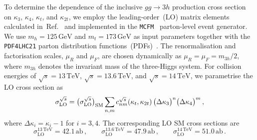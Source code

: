 \documentclass{SciPost}
\def\beq{\begin{equation}}
\def\eeq{\end{equation}}
\begin{document}
To determine the dependence of the inclusive $gg \to 3h$ production cross section on $\kappa_3$, $\kappa_4$, $\kappa_t$, and $\kappa_{2t}$, we employ the leading-order~(LO) matrix elements calculated in~Ref.~\cite{Campbell:2025llb} and implemented in the {\tt MCFM}~\cite{Campbell:1999ah,Campbell:2011bn,Campbell:2015qma,Campbell:2019dru} parton-level event generator. We use $m_h = 125\,\mathrm{GeV}$ and $m_t = 173\,\mathrm{GeV}$ as input parameters together with the {\tt PDF4LHC21} parton distribution functions~(PDFs)~\cite{PDF4LHCWorkingGroup:2022cjn}. The renormalisation and factorisation scales, $\mu_R$ and $\mu_F$, are chosen dynamically as $\mu_R = \mu_F = m_{3h}/2$, where $m_{3h}$ denotes the invariant mass of the three-Higgs system. For collision energies of $\sqrt{s}=13\,\mathrm{TeV}$, $\sqrt{s}=13.6\,\mathrm{TeV}$, and $\sqrt{s}=14\,\mathrm{TeV}$, we parametrise the LO cross section as
\beq \label{eq:BSMLO}
\sigma_{\mathrm{LO}}^{\sqrt{s}} = \big(\sigma_{\mathrm{LO}}^{\sqrt{s}}\big)_{\rm SM} \sum_{n,m} c_{nm}^{\sqrt{s}}\!\left(\kappa_t,\kappa_{2t}\right) \big(\Delta\kappa_3\big)^n \big(\Delta\kappa_4\big)^m \,,
\eeq
where $\Delta\kappa_i=\kappa_i-1$ for $i=3,4$. The corresponding LO SM cross sections are
\beq \label{eq:SMLO}
\sigma_{\mathrm{LO}}^{13\,\mathrm{TeV}} = 42.1\,\mathrm{ab} \,, \qquad
\sigma_{\mathrm{LO}}^{13.6\,\mathrm{TeV}} = 47.9\,\mathrm{ab} \,, \qquad
\sigma_{\mathrm{LO}}^{14\,\mathrm{TeV}} = 51.0\,\mathrm{ab} \,.
\eeq
\end{document}
